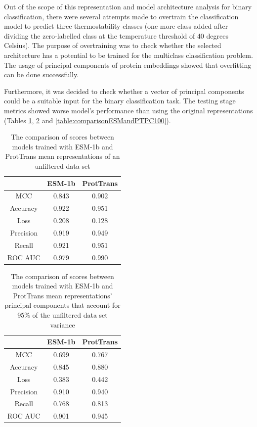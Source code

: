 \documentclass[12pt]{article}
\begin{document}
	Out of the scope of this representation and model architecture analysis
	for binary classification, there were several attempts made to overtrain
	the classification model to predict three thermostability classes (one 
	more class added after dividing the zero-labelled class at the temperature
	threshold of 40 degrees Celsius). The purpose of overtraining was to check 
	whether the selected architecture has a potential to be trained for the 
	multiclass classification problem. The usage of principal 
	components of protein embeddings showed that overfitting can be 
	done successfully.

	Furthermore, it was decided to check whether 
	a vector of principal components could be a suitable input for the binary 
	classification task. The testing stage metrics showed worse model's performance 
	than using the original representations (Tables \ref{table:comparisonESMandPTdup}, 
	\ref{table:comparisonESMandPTPC95} and 
	\ref{table:comparisonESMandPTPC100}). 

	\begin{table}[h!]
		\caption{The comparison of scores between models trained with ESM-1b
		and ProtTrans mean representations of an unfiltered data set}
		\vspace{0.2cm}
		\centering
		\begin{tabular}{ | c | c c | }
			\hline 
						
			& ESM-1b & ProtTrans \\
			\hline 
			MCC & 0.843 & 0.902 \\
			Accuracy & 0.922 & 0.951 \\
			Loss & 0.208 & 0.128 \\
			Precision & 0.919 & 0.949 \\
			Recall & 0.921 & 0.951 \\
			ROC AUC & 0.979 & 0.990 \\
			\hline    
		\end{tabular}
		\label{table:comparisonESMandPTdup}
	\end{table}

	\begin{table}[h!]
		\caption{The comparison of scores between models trained with ESM-1b
		and ProtTrans mean representations' principal components 
		that account for 95\% of the unfiltered data set variance}
		\vspace{0.2cm}
		\centering
		\begin{tabular}{ | c | c c | }
			\hline 
						
			& ESM-1b & ProtTrans \\
			\hline 
			MCC & 0.699 & 0.767 \\
			Accuracy & 0.845 & 0.880 \\
			Loss & 0.383 & 0.442 \\
			Precision & 0.910 & 0.940 \\
			Recall & 0.768 & 0.813 \\
			ROC AUC & 0.901 & 0.945 \\
			\hline    
		\end{tabular}
		\label{table:comparisonESMandPTPC95}
	\end{table}
\end{document}

